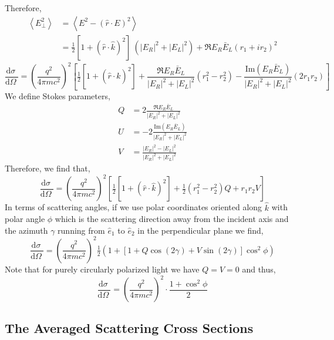 \documentclass[12pt]{extarticle}
\renewcommand{\Im}[1]{\mathrm{Im}(#1)}
\renewcommand{\d}[1]{ \mathrm{d}#1 \:}
\newcommand{\deriv}[2]{\frac{\d{#1}}{\d{#2}}}
\theoremstyle{definition}
\begin{document}
Therefore,
\begin{align*}
\left< E_\perp^2 \right> & = \left< E^2 - (\hat{r} \cdot E)^2  \right>
\\
& = \tfrac{1}{2} [ 1 +  (\hat{r} \cdot \hat{k})^2 ] \: (|E_R|^2 + |E_L|^2) + \Re{E_R \bar{E}_L (r_1 + i r_2)^2}
\end{align*}
\[ \deriv{\sigma}{\Omega} = \left( \frac{q^2}{4 \pi m c^2} \right)^2  \left[ \tfrac{1}{2} [ 1 +  (\hat{r} \cdot \hat{k})^2 ] + \frac{\Re{E_R \bar{E}_L}}{|E_R|^2 + |E_L|^2} (r_1^2 - r_2^2) - \frac{\Im{E_R \bar{E}_L}}{|E_R|^2 + |E_L|^2} (2 r_1 r_2)  \right] \]
We define Stokes parameters,
\begin{align*}
Q & = 2 \frac{\Re{E_R \bar{E}_L}}{|E_R|^2 + |E_L|^2}
\\
U & = - 2 \frac{\Im{E_R \bar{E}_L}}{|E_R|^2 + |E_L|^2}
\\
V & = \frac{|E_R|^2 - |E_L|^2}{|E_R|^2 + |E_L|^2}
\end{align*}
Therefore, we find that,
\[ \deriv{\sigma}{\Omega} = \left( \frac{q^2}{4 \pi m c^2} \right)^2  \left[ \tfrac{1}{2} [ 1 +  (\hat{r} \cdot \hat{k})^2 ] + \tfrac{1}{2} (r_1^2 - r_2^2) Q + r_1 r_2 V  \right] \]
In terms of scattering angles, if we use polar coordinates oriented along $\hat{k}$ with polar angle $\phi$ which is the scattering direction away from the incident axis and the azimuth $\gamma$ running from $\hat{e}_1$ to $\hat{e}_2$ in the perpendicular plane we find,
\[ \deriv{\sigma}{\Omega} = \left( \frac{q^2}{4 \pi m c^2} \right)^2  \tfrac{1}{2} \left(1 + \left[ 1 + Q \cos{(2 \gamma)} + V \sin{(2 \gamma)} \right] \cos^2{\phi} \right) \]
Note that for purely circularly polarized light we have $Q = V = 0$ and thus,
\[ \deriv{\sigma}{\Omega} = \left( \frac{q^2}{4 \pi m c^2} \right)^2 \cdot \frac{1 + \cos^2{\phi}}{2} \]

\subsection{The Averaged Scattering Cross Sections}
\end{document}
